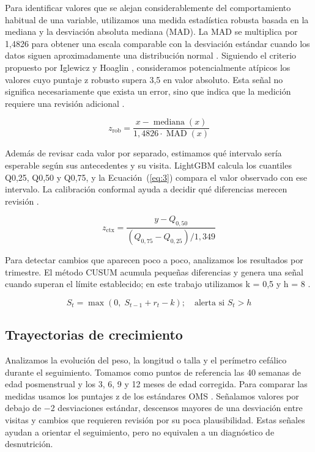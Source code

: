 Para identificar valores que se alejan considerablemente del comportamiento habitual de una variable, utilizamos una medida estadística robusta basada en la mediana y la desviación absoluta mediana (MAD). La MAD se multiplica por 1,4826 para obtener una escala comparable con la desviación estándar cuando los datos siguen aproximadamente una distribución normal \cite{r27}. Siguiendo el criterio propuesto por Iglewicz y Hoaglin \cite{r28}, consideramos potencialmente atípicos los valores cuyo puntaje z robusto supera 3,5 en valor absoluto. Esta señal no significa necesariamente que exista un error, sino que indica que la medición requiere una revisión adicional \cite{r14}.

\begin{equation}
z_{\text{rob}} = \frac{x-\operatorname{mediana}(x)}{1{,}4826\cdot \operatorname{MAD}(x)}
\label{eq:2}
\end{equation}

Además de revisar cada valor por separado, estimamos qué intervalo sería esperable según sus antecedentes y su visita. LightGBM calcula los cuantiles Q0,25, Q0,50 y Q0,75, y la Ecuación~(\ref{eq:3}) compara el valor observado con ese intervalo. La calibración conformal ayuda a decidir qué diferencias merecen revisión \cite{r15,r16,r17}.

\begin{equation}
z_{\text{ctx}} = \frac{y-Q_{0{,}50}}{(Q_{0{,}75}-Q_{0{,}25})/1{,}349}
\label{eq:3}
\end{equation}

Para detectar cambios que aparecen poco a poco, analizamos los resultados por trimestre. El método CUSUM acumula pequeñas diferencias y genera una señal cuando superan el límite establecido; en este trabajo utilizamos k = 0,5 y h = 8 \cite{r25}.

\begin{equation}
S_t = \max(0,\;S_{t-1}+r_t-k);\quad \text{alerta si } S_t>h
\label{eq:4}
\end{equation}

\subsection{Trayectorias de crecimiento}
\label{sec:3.3}

Analizamos la evolución del peso, la longitud o talla y el perímetro cefálico durante el seguimiento. Tomamos como puntos de referencia las 40 semanas de edad posmenstrual y los 3, 6, 9 y 12 meses de edad corregida. Para comparar las medidas usamos los puntajes z de los estándares OMS \cite{r29,r30}. Señalamos valores por debajo de $-$2 desviaciones estándar, descensos mayores de una desviación entre visitas y cambios que requieren revisión por su poca plausibilidad. Estas señales ayudan a orientar el seguimiento, pero no equivalen a un diagnóstico de desnutrición.


